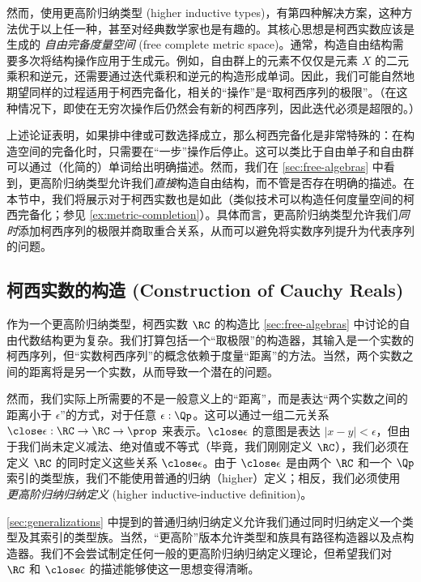然而，使用更高阶归纳类型 (higher inductive types)，有第四种解决方案，这种方法优于以上任一种，甚至对经典数学家也是有趣的。其核心思想是柯西实数应该是 \Q 生成的 \emph{自由完备度量空间} (free complete metric space)。通常，构造自由结构需要多次将结构操作应用于生成元。例如，自由群上的元素不仅仅是元素 $X$ 的二元乘积和逆元，还需要通过迭代乘积和逆元的构造形成单词。因此，我们可能自然地期望同样的过程适用于柯西完备化，相关的“操作”是“取柯西序列的极限”。（在这种情况下，即使在无穷次操作后仍然会有新的柯西序列，因此迭代必须是超限的。）

上述论证表明，如果排中律或可数选择成立，那么柯西完备化是非常特殊的：在构造空间的完备化时，只需要在“一步”操作后停止。这可以类比于自由单子和自由群可以通过（化简的）单词给出明确描述。然而，我们在 \cref{sec:free-algebras} 中看到，更高阶归纳类型允许我们\emph{直接}构造自由结构，而不管是否存在明确的描述。在本节中，我们将展示对于柯西实数也是如此（类似技术可以构造任何度量空间的柯西完备化；参见 \cref{ex:metric-completion}）。具体而言，更高阶归纳类型允许我们\emph{同时}添加柯西序列的极限并商取重合关系，从而可以避免将实数序列提升为代表序列的问题。
%

\subsection{柯西实数的构造 (Construction of Cauchy Reals)}
\label{sec:constr-cauchy-reals}

作为一个更高阶归纳类型，柯西实数 $\RC$ 的构造比 \cref{sec:free-algebras} 中讨论的自由代数结构更为复杂。我们打算包括一个“取极限”的构造器，其输入是一个实数的柯西序列，但“实数柯西序列”的概念依赖于度量“距离”的方法。当然，两个实数之间的距离将是另一个实数，从而导致一个潜在的问题。

然而，我们实际上所需要的不是一般意义上的“距离”，而是表达“两个实数之间的距离小于 $\epsilon$”的方式，对于任意 $\epsilon:\Qp$。这可以通过一组二元关系 $\mathord{\close\epsilon} : \RC\to\RC\to \prop$ 来表示。$\mathord{\close\epsilon}$ 的意图是表达 $|x - y| < \epsilon$，但由于我们尚未定义减法、绝对值或不等式（毕竟，我们刚刚定义 $\RC$），我们必须在定义 $\RC$ 的同时定义这些关系 $\close\epsilon$。由于 $\close\epsilon$ 是由两个 $\RC$ 和一个 $\Qp$ 索引的类型族，我们不能使用普通的归纳（higher）定义；相反，我们必须使用 \emph{更高阶归纳归纳定义} (higher inductive-inductive definition)。

\cref{sec:generalizations} 中提到的普通归纳归纳定义允许我们通过同时归纳定义一个类型及其索引的类型族。当然，“更高阶”版本允许类型和族具有路径构造器以及点构造器。我们不会尝试制定任何一般的更高阶归纳归纳定义理论，但希望我们对 $\RC$ 和 $\close\epsilon$ 的描述能够使这一思想变得清晰。

